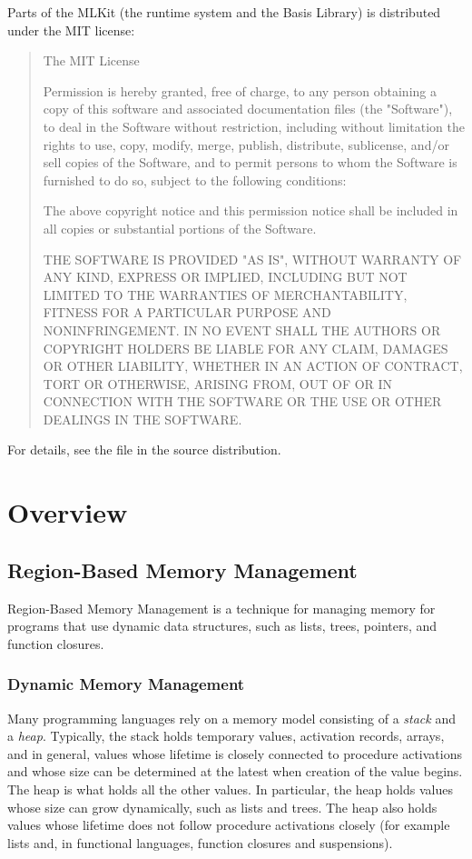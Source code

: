 \documentclass[12pt]{book}
\begin{document}
Parts of the MLKit (the runtime system and the Basis Library) is distributed
under the MIT license: {\sc
\begin{quote}
The MIT License

Permission is hereby granted, free of charge, to any person obtaining
a copy of this software and associated documentation files (the
"Software"), to deal in the Software without restriction, including
without limitation the rights to use, copy, modify, merge, publish,
distribute, sublicense, and/or sell copies of the Software, and to
permit persons to whom the Software is furnished to do so, subject to
the following conditions:

The above copyright notice and this permission notice shall be
included in all copies or substantial portions of the Software.

THE SOFTWARE IS PROVIDED "AS IS", WITHOUT WARRANTY OF ANY KIND,
EXPRESS OR IMPLIED, INCLUDING BUT NOT LIMITED TO THE WARRANTIES OF
MERCHANTABILITY, FITNESS FOR A PARTICULAR PURPOSE AND
NONINFRINGEMENT. IN NO EVENT SHALL THE AUTHORS OR COPYRIGHT HOLDERS BE
LIABLE FOR ANY CLAIM, DAMAGES OR OTHER LIABILITY, WHETHER IN AN ACTION
OF CONTRACT, TORT OR OTHERWISE, ARISING FROM, OUT OF OR IN CONNECTION
WITH THE SOFTWARE OR THE USE OR OTHER DEALINGS IN THE SOFTWARE.
\end{quote}
}

For details, see the file  in the source
distribution.


\part{Overview}

\chapter{Region-Based Memory Management}
\label{intro.sec}
Region-Based Memory Management is a technique for managing memory for programs
that use dynamic data structures, such as lists, trees, pointers, and function
closures.

\section{Dynamic Memory Management}
Many programming languages rely on a memory model consisting of a {\em stack}
%
%
%
and a
%
%
{\em heap}. Typically, the stack holds temporary values, activation records,
arrays, and in general, values whose lifetime is closely connected to procedure
activations and whose size can be determined at the latest when creation of the
value begins.  The heap is what holds all the other values. In particular, the
heap holds values whose size can grow dynamically, such as lists and trees. The
heap also holds values whose lifetime does not follow procedure activations
closely (for example lists and, in functional languages, function closures and
suspensions).
\end{document}
